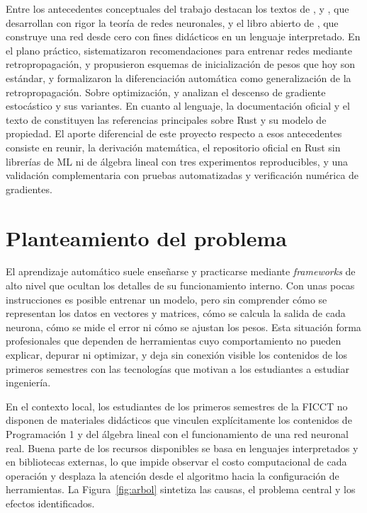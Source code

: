 Entre los antecedentes conceptuales del trabajo destacan los textos de \citet{haykin2009}, \citet{bishop2006} y \citet{goodfellow2016}, que desarrollan con rigor la teoría de redes neuronales, y el libro abierto de \citet{nielsen2015}, que construye una red desde cero con fines didácticos en un lenguaje interpretado. En el plano práctico, \citet{lecun1998} sistematizaron recomendaciones para entrenar redes mediante retropropagación, \citet{glorot2010} y \citet{he2015} propusieron esquemas de inicialización de pesos que hoy son estándar, y \citet{baydin2018} formalizaron la diferenciación automática como generalización de la retropropagación. Sobre optimización, \citet{bottou2010} y \citet{ruder2016} analizan el descenso de gradiente estocástico y sus variantes. En cuanto al lenguaje, la documentación oficial \citep{klabnik2023} y el texto de \citet{blandy2021} constituyen las referencias principales sobre Rust y su modelo de propiedad. El aporte diferencial de este proyecto respecto a esos antecedentes consiste en reunir, la derivación matemática, el repositorio oficial en Rust sin librerías de ML ni de álgebra lineal con tres experimentos reproducibles, y una validación complementaria con pruebas automatizadas y verificación numérica de gradientes.

\section{Planteamiento del problema}\label{sec:problema}
El aprendizaje automático suele enseñarse y practicarse mediante \emph{frameworks} de alto nivel que ocultan los detalles de su funcionamiento interno. Con unas pocas instrucciones es posible entrenar un modelo, pero sin comprender cómo se representan los datos en vectores y matrices, cómo se calcula la salida de cada neurona, cómo se mide el error ni cómo se ajustan los pesos. Esta situación forma profesionales que dependen de herramientas cuyo comportamiento no pueden explicar, depurar ni optimizar, y deja sin conexión visible los contenidos de los primeros semestres con las tecnologías que motivan a los estudiantes a estudiar ingeniería.

En el contexto local, los estudiantes de los primeros semestres de la FICCT no disponen de materiales didácticos que vinculen explícitamente los contenidos de Programación 1 y del álgebra lineal con el funcionamiento de una red neuronal real. Buena parte de los recursos disponibles se basa en lenguajes interpretados y en bibliotecas externas, lo que impide observar el costo computacional de cada operación y desplaza la atención desde el algoritmo hacia la configuración de herramientas. La Figura~\ref{fig:arbol} sintetiza las causas, el problema central y los efectos identificados.

